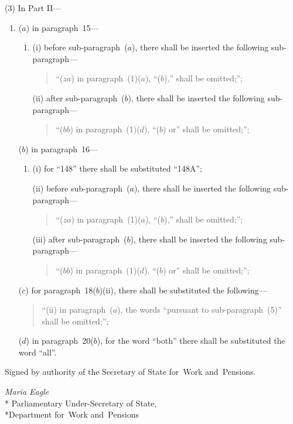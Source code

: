 \documentclass[12pt,a4paper]{article}
\begin{document}
(3) In Part II—
\begin{enumerate}\item[]
($a$) in paragraph~15—
\begin{enumerate}\item[]
(i) before sub-paragraph~($a$), there shall be inserted the following sub-paragraph—
\begin{quotation}
“($za$) in paragraph~(1)($a$), “($b$),” shall be omitted;”;
\end{quotation}

(ii) after sub-paragraph~($b$), there shall be inserted the following sub-paragraph—
\begin{quotation}
“($bb$) in paragraph~(1)($d$), “($b$)  or” shall be omitted;”;
\end{quotation}
\end{enumerate}

($b$) in paragraph~16—
\begin{enumerate}\item[]
(i) for “148” there shall be substituted “148A”;

(ii) before sub-paragraph~($a$), there shall be inserted the following sub-paragraph—
\begin{quotation}
“($za$) in paragraph~(1)($a$), “($b$),” shall be omitted;”;
\end{quotation}

(iii) after sub-paragraph~($b$), there shall be inserted the following sub-paragraph—
\begin{quotation}
“($bb$) in paragraph~(1)($d$), “($b$)  or” shall be omitted;”;
\end{quotation}
\end{enumerate}

($c$) for paragraph~18($b$)(ii), there shall be substituted the following—
\begin{quotation}
“(ii) in paragraph~($a$), the words “pursuant to sub-\hspace{0pt}paragraph~(5)” shall be omitted;”;
\end{quotation}

($d$) in paragraph~20($b$), for the word “both” there shall be substituted the word “all”.
\end{enumerate}

\bigskip

Signed 
by authority of the 
Secretary of State for~Work and~Pensions.

{\raggedleft
\emph{Maria Eagle}\\*
Parliamentary Under-Secretary 
of State,\\*Department 
for~Work and~Pensions

}
\end{document}
